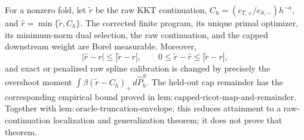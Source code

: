 For a nonzero fold, let \(\widetilde r\) be the raw KKT continuation, \(C_h=(c_{T,+}/c_{S,-})h^{-a}\), and \(\widehat r=\min\{\widetilde r,C_h\}\). The corrected finite program, its unique primal optimizer, its minimum-norm dual selection, the raw continuation, and the capped downstream weight are Borel measurable. Moreover,
\[
|\widehat r-r|\le|\widetilde r-r|,
\qquad
0\le\widetilde r-\widehat r\le|\widetilde r-r|,
\]
and exact or penalized raw spline calibration is changed by precisely the overshoot moment \(\int\beta(\widetilde r-C_h)_+\,d\widehat P_h^S\). The held-out cap remainder has the corresponding empirical bound proved in \(\mathrm{lem:capped\text{-}ricot\text{-}map\text{-}and\text{-}remainder}\). Together with \(\mathrm{lem:oracle\text{-}truncation\text{-}envelope}\), this reduces attainment to a raw-continuation localization and generalization theorem; it does not prove that theorem.